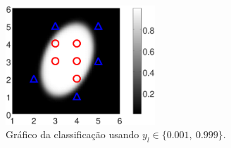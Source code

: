 \begin{figure}[!h]
        \centering
        \includegraphics[width=0.5\textwidth]{chapters/classificacao/mfiles/reglogrnr1poly2/ex1s2-reglogrnr1poly.eps}
        \caption{Gráfico da classificação usando $y_l \in \{0.001,~ 0.999\}$.}
        \label{fig:theo:reglogrnr1poly:xn:s3}
\end{figure}
